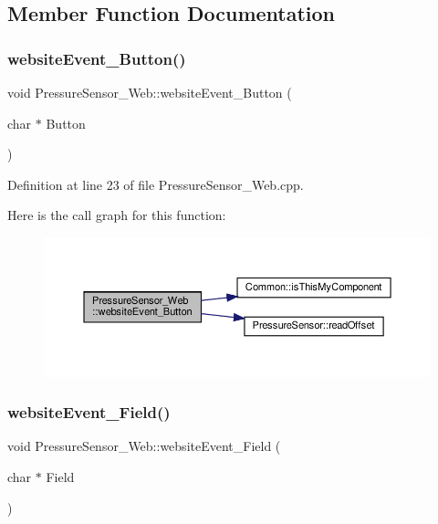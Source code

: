\subsection{Member Function Documentation}
\mbox{\label{class_pressure_sensor___web_ad4f31802ab30bf6f21157a8504fcb023}} 
\subsubsection{\texorpdfstring{website\+Event\+\_\+\+Button()}{websiteEvent\_Button()}}
{\footnotesize\ttfamily void Pressure\+Sensor\+\_\+\+Web\+::website\+Event\+\_\+\+Button (\begin{DoxyParamCaption}\item[{char $\ast$}]{Button }\end{DoxyParamCaption})}



Definition at line 23 of file Pressure\+Sensor\+\_\+\+Web.\+cpp.

Here is the call graph for this function\+:
\nopagebreak
\begin{figure}[H]
\begin{center}
\leavevmode
\includegraphics[width=350pt]{class_pressure_sensor___web_ad4f31802ab30bf6f21157a8504fcb023_cgraph}
\end{center}
\end{figure}
\mbox{\label{class_pressure_sensor___web_a0529277efb48cb5def4d6271d45a508f}} 
\subsubsection{\texorpdfstring{website\+Event\+\_\+\+Field()}{websiteEvent\_Field()}}
{\footnotesize\ttfamily void Pressure\+Sensor\+\_\+\+Web\+::website\+Event\+\_\+\+Field (\begin{DoxyParamCaption}\item[{char $\ast$}]{Field }\end{DoxyParamCaption})}



